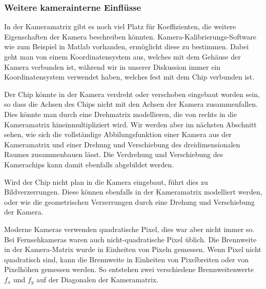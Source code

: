 \subsubsection{Weitere kamerainterne Einflüsse}
In der Kameramatrix gibt es noch viel Platz für Koeffizienten, die
weitere Eigenschaften der Kamera beschreiben könnten.
Kamera-Kalibrierungs-Software wie zum Beispiel in Matlab vorhanden,
ermöglicht diese zu bestimmen.
Dabei geht man von einem Koordinatensystem aus, welches mit dem Gehäuse
der Kamera verbunden ist, während wir in unserer Diskussion immer
ein Koordinatensystem verwendet haben, welches fest mit dem Chip
verbunden ist.

Der Chip könnte in der Kamera verdreht oder verschoben eingebaut worden sein,
so dass die Achsen des Chips nicht mit den Achsen der Kamera zusammenfallen.
Dies könnte man durch eine Drehmatrix modellieren, die von rechts in die
Kameramatrix hineinmultipliziert wird.
Wir werden aber im nächsten Abschnitt sehen, wie sich die vollständige
Abbilungsfunktion einer Kamera aus der Kameramatrix und einer Drehung
und Verschiebung des dreidimensionalen Raumes zusammenbauen lässt.
Die Verdrehung und Verschiebung des Kamerachips kann damit ebenfalls
abgebildet werden.

Wird der Chip nicht plan in die Kamera eingebaut, führt dies
zu Bildverzerrungen.
Diese können ebenfalls in der Kameramatrix modelliert werden,
oder wie die geometrischen Verzerrungen durch eine Drehung und
Verschiebung der Kamera.

Moderne Kameras verwenden quadratische Pixel, dies war aber nicht
immer so.
Bei Fernsehkameras waren auch nicht-quadratische Pixel üblich.
Die Brennweite in der Kamera-Matrix wurde in Einheiten von Pixeln
gemessen.
Wenn Pixel nicht quadratisch sind, kann die Brennweite in Einheiten von
Pixelbreiten oder von Pixelhöhen gemessen werden.
So entstehen zwei verschiedene Brennweitenwerte $f_x$ und $f_y$ auf der
Diagonalen der Kameramatrix.



